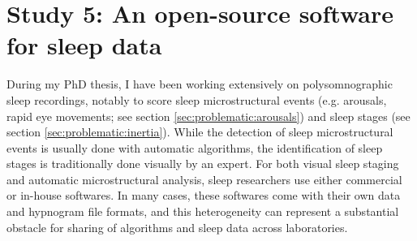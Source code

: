 \section{Study 5: An open-source software for sleep data}
\label{sec:problematic:software}

During my PhD thesis, I have been working extensively on polysomnographic sleep recordings, notably to score sleep microstructural events (e.g. arousals, rapid eye movements; see section \ref{sec:problematic:arousals}) and sleep stages (see section \ref{sec:problematic:inertia}). While the detection of sleep microstructural events is usually done with automatic algorithms, the identification of sleep stages is traditionally done visually by an expert. For both visual sleep staging and automatic microstructural analysis, sleep researchers use either commercial or in-house softwares. In many cases, these softwares come with their own data and hypnogram file formats, and this heterogeneity can represent a substantial obstacle for sharing of algorithms and sleep data across laboratories.



